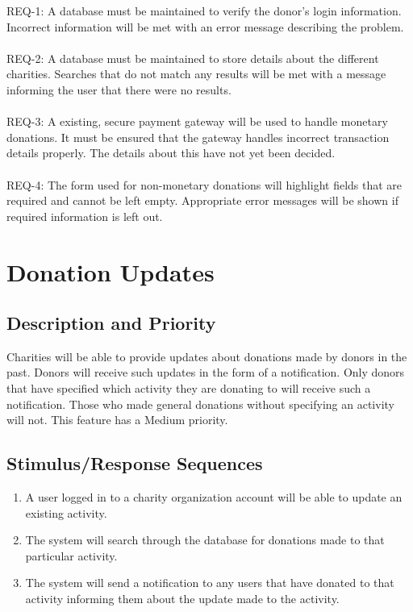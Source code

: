 \documentclass{scrreprt}
\begin{document}
REQ-1:	A database must be maintained to verify the donor’s login information. Incorrect information will be met with an error message describing the problem.\\
\\REQ-2:	A database must be maintained to store details about the different charities. Searches that do not match any results will be met with a message informing the user that there were no results.\\
\\REQ-3:	A existing, secure payment gateway will be used to handle monetary donations. It must be ensured that the gateway handles incorrect transaction details properly. The details about this have not yet been decided.\\
\\REQ-4:	The form used for non-monetary donations will highlight fields that are required and cannot be left empty. Appropriate error messages will be shown if required information is left out.\\


\section{Donation Updates}

\vspace{1cm}

\subsection{Description and Priority}

Charities will be able to provide updates about donations made by donors in the past. Donors will receive such updates in the form of a notification. Only donors that have specified which activity they are donating to will receive such a notification. Those who made general donations without specifying an activity will not. This feature has a Medium priority.\\

\subsection{Stimulus/Response Sequences}

\begin{enumerate}[label=(\alph*)]
\item A user logged in to a charity organization account will be able to update an existing activity.
\item The system will search through the database for donations made to that particular activity.
\item The system will send a notification to any users that have donated to that activity informing them about the update made to the activity.\\

\end{enumerate}
\end{document}
